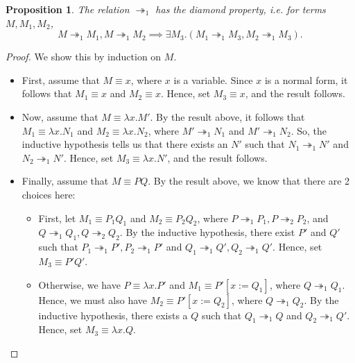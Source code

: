 \documentclass[a4paper, openany]{memoir}
\newtheorem{proposition}{Proposition}[section]
\theoremstyle{definition}
\begin{document}
    \begin{proposition}
        The relation $\twoheadrightarrow_1$ has the diamond property, i.e. for terms $M, M_1, M_2$,
        \[M \twoheadrightarrow_1 M_1, M \twoheadrightarrow_1 M_2 \implies \exists M_3 . (M_1 \twoheadrightarrow_ 1 M_3, M_2 \twoheadrightarrow_1 M_3).\]
    \end{proposition}
    \begin{proof}
        We show this by induction on $M$.
        \begin{itemize}
            \item First, assume that $M \equiv x$, where $x$ is a variable. Since $x$ is a normal form, it follows that $M_1 \equiv x$ and $M_2 \equiv x$. Hence, set $M_3 \equiv x$, and the result follows.

            \item Now, assume that $M \equiv \lambda x.M'$. By the result above, it follows that $M_1 \equiv \lambda x.N_1$ and $M_2 \equiv \lambda x.N_2$, where $M' \twoheadrightarrow_1 N_1$ and $M' \twoheadrightarrow_1 N_2$. So, the inductive hypothesis tells us that there exists an $N'$ such that $N_1 \twoheadrightarrow_1 N'$ and $N_2 \twoheadrightarrow_1 N'$. Hence, set $M_3 \equiv \lambda x.N'$, and the result follows.
            
            \item Finally, assume that $M \equiv PQ$. By the result above, we know that there are 2 choices here:
            \begin{itemize}
                \item First, let $M_1 \equiv P_1 Q_1$ and $M_2 \equiv P_2 Q_2$, where $P \twoheadrightarrow_1 P_1, P \twoheadrightarrow_2 P_2$, and $Q \twoheadrightarrow_1 Q_1, Q \twoheadrightarrow_2 Q_2$. By the inductive hypothesis, there exist $P'$ and $Q'$ such that $P_1 \twoheadrightarrow_1 P', P_2 \twoheadrightarrow_1 P'$ and $Q_1 \twoheadrightarrow_1 Q', Q_2 \twoheadrightarrow_1 Q'$. Hence, set $M_3 \equiv P' Q'$.
                
                \item Otherwise, we have $P \equiv \lambda x.P'$ and $M_1 \equiv P'[x := Q_1]$, where $Q \twoheadrightarrow_1 Q_1$. Hence, we must also have $M_2 \equiv P'[x := Q_2]$, where $Q \twoheadrightarrow_1 Q_2$. By the inductive hypothesis, there exists a $Q$ such that $Q_1 \twoheadrightarrow_1 Q$ and $Q_2 \twoheadrightarrow_1 Q'$. Hence, set $M_3 \equiv \lambda x.Q$.
            \end{itemize}
        \end{itemize}
    \end{proof}
\end{document}

